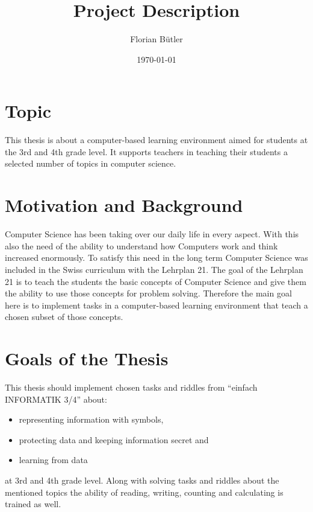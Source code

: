 \documentclass[a4paper, oneside]{discothesis}
\title{Project Description}
\author{Florian Bütler}
\institute{Chair of Information Technology and Education \\[2pt]
ETH Zürich}
\date{\today}
\begin{document}
\frontmatter %
\maketitle

\cleardoublepage

\mainmatter %

\section*{Topic}

This thesis is about a computer-based learning environment aimed for students at the 3rd and 4th grade level. It supports teachers in teaching their students a selected number of topics in computer science.

\section*{Motivation and Background}

Computer Science has been taking over our daily life in every aspect. With this also the need of the ability to understand how Computers work and think increased enormously. To satisfy this need in the long term Computer Science was included in the Swiss curriculum with the Lehrplan 21.
The goal of the Lehrplan 21 is to teach the students the basic concepts of Computer Science and give them the ability to use those concepts for problem solving. Therefore the main goal here is to implement tasks in a computer-based learning environment that teach a chosen subset of those concepts.

\section*{Goals of the Thesis}

This thesis should implement chosen tasks and riddles from “einfach INFORMATIK 3/4” about:
\begin{itemize}
  \item representing information with symbols,
  \item protecting data and keeping information secret and
  \item learning from data
\end{itemize}
at 3rd and 4th grade level.
Along with solving tasks and riddles about the mentioned topics the ability of reading, writing, counting and calculating is trained as well.
\end{document}
